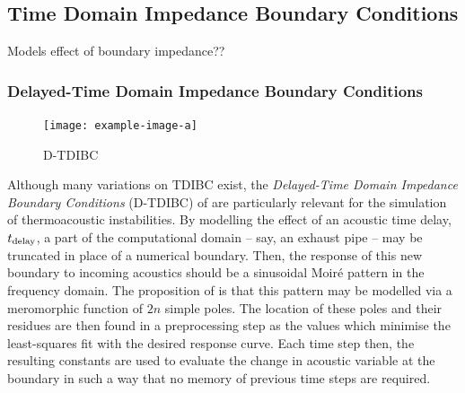 








\subsection{Time Domain Impedance Boundary Conditions}


Models effect of boundary impedance??


\subsubsection{Delayed-Time Domain Impedance Boundary Conditions}

\begin{figure}[t]
\centering
\texttt{[image: example-image-a]}
\caption{D-TDIBC}
\label{fig:D-TDIBC}
\end{figure}
        
Although many variations on TDIBC exist, the \emph{Delayed-Time Domain Impedance Boundary Conditions} (D-TDIBC) of \cite{douasbin2018DelayedtimeDomainImpedance} are particularly relevant for the simulation of thermoacoustic instabilities. By modelling the effect of an acoustic time delay, $t_{\rm{delay}}$, a part of the computational domain -- say, an exhaust pipe -- may be truncated in place of a numerical boundary. Then, the response of this new boundary to incoming acoustics should be a sinusoidal Moiré pattern in the frequency domain. The proposition of \cite{douasbin2018DelayedtimeDomainImpedance} is that this pattern may be modelled via a meromorphic function of $2n$ simple poles. The location of these poles and their residues are then found in a preprocessing step as the values which minimise the least-squares fit with the desired response curve. Each time step then, the resulting constants are used to evaluate the change in acoustic variable at the boundary in such a way that no memory of previous time steps are required. 


